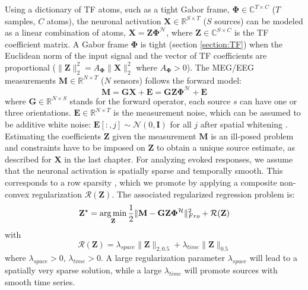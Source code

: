 Using a dictionary of TF atoms, such as a tight Gabor frame, $\mathbf{\Phi} \in \mathbb{C}^{T \times C}$
($T$ samples, $C$ atoms), the neuronal activation $\mathbf{X} \in \mathbb{R}^{S \times T}$ ($S$ sources) can be modeled as a linear combination of atoms, $\mathbf{X}=\mathbf{Z\Phi}^{\mathcal{H}}$, where $\mathbf{Z} \in \mathbb{C}^{S \times C}$ is the TF coefficient matrix. A Gabor frame $\mathbf{\Phi}$ is tight (section \ref{section:TF}) when the Euclidean norm of the input signal and the vector of TF coefficients are proportional ($\|\mathbf{Z}\|_2^2 = A_\mathbf{\Phi} \|\mathbf{X}\|_2^2$ where $A_\mathbf{\Phi}>0$). %
The MEG/EEG measurements $\mathbf{M} \in \mathbb{R}^{N \times T}$ ($N$ sensors) follows the forward model:
\begin{equation} \label{eq1}
    \mathbf{M} = \mathbf{GX + E} = \mathbf{GZ \Phi^{\mathcal{H}} + E}
\end{equation}
where $\mathbf{G} \in \mathbb{R}^{N \times S}$ stands for the forward operator, each source $s$ can have one or three orientations. $\mathbf{E} \in \mathbb{R}^{N \times T}$ is the measurement noise, which can be assumed to be additive white noise: $\mathbf{E}[:, j] \sim \mathcal{N}(0, \mathbf{I})$ for all $j$ after spatial whitening \cite{denis}. Estimating the coefficients $\mathbf{Z}$ given the measurement $\mathbf{M}$ is an ill-posed problem and constraints have to be imposed on $\mathbf{Z}$ to obtain a unique source estimate, as described for $\mathbf{X}$ in the last chapter. For analyzing evoked responses, we assume that the neuronal activation is spatially sparse and temporally smooth. This corresponds to a row sparsity \cite{Alex13}, which we promote by applying a composite non-convex regularization $\mathcal{R}(\mathbf{Z})$. The associated regularized regression problem is:
\begin{equation} \label{eq2}
    \mathbf{Z}^\star = \mathop{\mathrm{arg}\,\mathrm{min}}_{\mathbf{Z}} \frac{1}{2}\|\mathbf{M - GZ\Phi^\mathcal{H}}\|^2_{Fro} + \mathcal{R}(\mathbf{Z})
\end{equation}
with
\begin{equation}
	\mathcal{R}(\mathbf{Z}) = \lambda_{space}\|\mathbf{Z}\|_{2,0.5} + \lambda_{time}\|\mathbf{Z}\|_{0.5}
\end{equation}
where $\lambda_{space} > 0$, $\lambda_{time}>0$. A large regularization parameter $\lambda_{space}$ will lead to a spatially very sparse solution, while a large $\lambda_{time}$ will promote sources with smooth time series.

